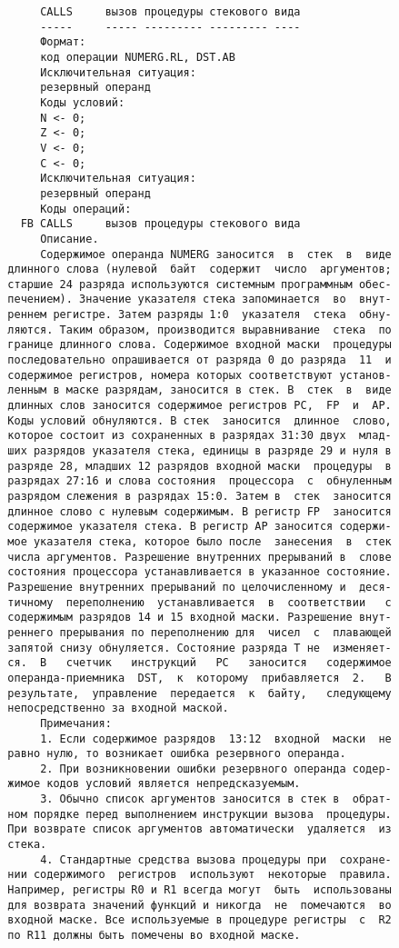\begin{verbatim}
       CALLS     вызов процедуры стекового вида
       -----     ----- --------- --------- ----
       Формат:
       код операции NUMERG.RL, DST.AB
       Исключительная ситуация:
       резервный операнд
       Коды условий:
       N <- 0;
       Z <- 0;
       V <- 0;
       C <- 0;
       Исключительная ситуация:
       резервный операнд
       Коды операций:
    FB CALLS     вызов процедуры стекового вида
       Описание.
       Содержимое операнда NUMERG заносится  в  стек  в  виде
  длинного слова (нулевой  байт  содержит  число  аргументов;
  старшие 24 разряда используются системным программным обес-
  печением). Значение указателя стека запоминается  во  внут-
  реннем регистре. Затем разряды 1:0  указателя  стека  обну-
  ляются. Таким образом, производится выравнивание  стека  по
  границе длинного слова. Содержимое входной маски  процедуры
  последовательно опрашивается от разряда 0 до разряда  11  и
  содержимое регистров, номера которых соответствуют установ-
  ленным в маске разрядам, заносится в стек. В  стек  в  виде
  длинных слов заносится содержимое регистров PC,  FP  и  AP.
  Коды условий обнуляются. В стек  заносится  длинное  слово,
  которое состоит из сохраненных в разрядах 31:30 двух  млад-
  ших разрядов указателя стека, единицы в разряде 29 и нуля в
  разряде 28, младших 12 разрядов входной маски  процедуры  в
  разрядах 27:16 и слова состояния  процессора  с  обнуленным
  разрядом слежения в разрядах 15:0. Затем в  стек  заносится
  длинное слово с нулевым содержимым. В регистр FP  заносится
  содержимое указателя стека. В регистр AP заносится содержи-
  мое указателя стека, которое было после  занесения  в  стек
  числа аргументов. Разрешение внутренних прерываний в  слове
  состояния процессора устанавливается в указанное состояние.
  Разрешение внутренних прерываний по целочисленному и  деся-
  тичному  переполнению  устанавливается  в  соответствии   с
  содержимым разрядов 14 и 15 входной маски. Разрешение внут-
  реннего прерывания по переполнению для  чисел  с  плавающей
  запятой снизу обнуляется. Состояние разряда T не  изменяет-
  ся.  В   счетчик   инструкций   PC   заносится   содержимое
  операнда-приемника  DST,  к  которому  прибавляется  2.   В
  результате,  управление  передается  к  байту,   следующему
  непосредственно за входной маской.
       Примечания:
       1. Если содержимое разрядов  13:12  входной  маски  не
  равно нулю, то возникает ошибка резервного операнда.
       2. При возникновении ошибки резервного операнда содер-
  жимое кодов условий является непредсказуемым.
       3. Обычно список аргументов заносится в стек в  обрат-
  ном порядке перед выполнением инструкции вызова  процедуры.
  При возврате список аргументов автоматически  удаляется  из
  стека.
       4. Стандартные средства вызова процедуры при  сохране-
  нии содержимого  регистров  используют  некоторые  правила.
  Например, регистры R0 и R1 всегда могут  быть  использованы
  для возврата значений функций и никогда  не  помечаются  во
  входной маске. Все используемые в процедуре регистры  с  R2
  по R11 должны быть помечены во входной маске.


\end{verbatim}
